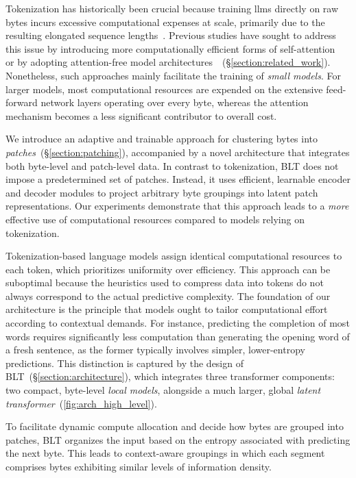 Tokenization has historically been crucial because training llms directly on raw bytes incurs excessive computational expenses at scale, primarily due to the resulting elongated sequence lengths~\citep{xue2022byt5}. Previous studies have sought to address this issue by introducing more computationally efficient forms of self-attention~\citep{el2020characterbert, clark2022canine} or by adopting attention-free model architectures~\citep{wang2024mambabyte}~(\S\ref{section:related_work}). Nonetheless, such approaches mainly facilitate the training of \textit{small models}. For larger models, most computational resources are expended on the extensive feed-forward network layers operating over every byte, whereas the attention mechanism becomes a less significant contributor to overall cost.

We introduce an adaptive and trainable approach for clustering bytes into \textit{patches}~(\S\ref{section:patching}), accompanied by a novel architecture that integrates both byte-level and patch-level data. In contrast to tokenization, {\textsc BLT} does not impose a predetermined set of patches. Instead, it uses efficient, learnable encoder and decoder modules to project arbitrary byte groupings into latent patch representations. Our experiments demonstrate that this approach leads to a \textit{more} effective use of computational resources compared to models relying on tokenization.

Tokenization-based language models assign identical computational resources to each token, which prioritizes uniformity over efficiency. This approach can be suboptimal because the heuristics used to compress data into tokens do not always correspond to the actual predictive complexity. The foundation of our architecture is the principle that models ought to tailor computational effort according to contextual demands. For instance, predicting the completion of most words requires significantly less computation than generating the opening word of a fresh sentence, as the former typically involves simpler, lower-entropy predictions. This distinction is captured by the design of {\textsc BLT}~(\S\ref{section:architecture}), which integrates three transformer components: two compact, byte-level \textit{local models}, alongside a much larger, global \textit{latent transformer}~(\autoref{fig:arch_high_level}). 

To facilitate dynamic compute allocation and decide how bytes are grouped into patches, {\textsc BLT} organizes the input based on the entropy associated with predicting the next byte. This leads to context-aware groupings in which each segment comprises bytes exhibiting similar levels of information density.

